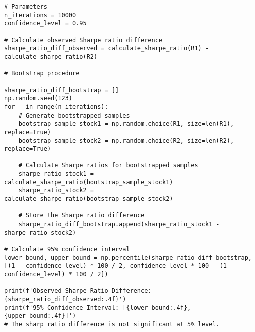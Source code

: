 \begin{enumerate}[(a)]
\begin{lstlisting}
# Parameters
n_iterations = 10000
confidence_level = 0.95

# Calculate observed Sharpe ratio difference
sharpe_ratio_diff_observed = calculate_sharpe_ratio(R1) - calculate_sharpe_ratio(R2)

# Bootstrap procedure

sharpe_ratio_diff_bootstrap = []
np.random.seed(123)
for _ in range(n_iterations):
    # Generate bootstrapped samples
    bootstrap_sample_stock1 = np.random.choice(R1, size=len(R1), replace=True)
    bootstrap_sample_stock2 = np.random.choice(R2, size=len(R2), replace=True)

    # Calculate Sharpe ratios for bootstrapped samples
    sharpe_ratio_stock1 = calculate_sharpe_ratio(bootstrap_sample_stock1)
    sharpe_ratio_stock2 = calculate_sharpe_ratio(bootstrap_sample_stock2)

    # Store the Sharpe ratio difference
    sharpe_ratio_diff_bootstrap.append(sharpe_ratio_stock1 - sharpe_ratio_stock2)

# Calculate 95% confidence interval
lower_bound, upper_bound = np.percentile(sharpe_ratio_diff_bootstrap, [(1 - confidence_level) * 100 / 2, confidence_level * 100 - (1 - confidence_level) * 100 / 2])

print(f'Observed Sharpe Ratio Difference: {sharpe_ratio_diff_observed:.4f}')
print(f'95% Confidence Interval: [{lower_bound:.4f}, {upper_bound:.4f}]')
# The sharp ratio difference is not significant at 5% level.

\end{lstlisting}
\end{enumerate}
